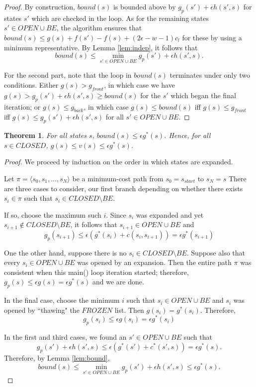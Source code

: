 \documentclass[letterpaper]{article}
\newtheorem{thm}{Theorem}
\begin{document}
\begin{proof}
By construction, $bound(s)$ is bounded above by $g_p(s') + \epsilon h(s',s)$ for states $s'$ which are checked in the loop. As for the remaining states $s' \in OPEN \cup BE$, the algorithm ensures that $bound(s) \le g(s) + f(s') - f(s) + (2\epsilon-w-1) c_l$ for these by using a minimum representative. By Lemma \ref{lem:indep}, it follows that
\[bound(s) \le \min_{s' \in OPEN \cup BE} g_p(s') + \epsilon h(s',s).\]

For the second part, note that the loop in $bound(s)$ terminates under only two conditions. Either $g(s) > g_{front}$, in which case we have $g(s) > g_p(s') + \epsilon h(s',s) \ge bound(s)$ for the $s'$ which began the final iteration; or $g(s) \le g_{back}$, in which case $g(s) \le bound(s)$ iff $g(s) \le g_{front}$ iff $g(s) \le g_p(s') + \epsilon h(s',s)$ for all $s' \in OPEN \cup BE$.
\end{proof}

\begin{thm}
\label{thm:subopt}
For all states $s$, $bound(s) \le \epsilon g^*(s)$. Hence, for all $s\in CLOSED$, $g(s) \le v(s) \le \epsilon g^*(s)$.
\end{thm}

\begin{proof}
We proceed by induction on the order in which states are expanded.

Let $\pi = \langle s_0,s_1,\ldots,s_N \rangle$ be a minimum-cost path from $s_0 = s_{start}$ to $s_N = s$
There are three cases to consider, our first branch depending on whether there exists $s_i\in\pi$ such that $s_i\in CLOSED\setminus BE$.

If so, choose the maximum such $i$. Since $s_i$ was expanded and yet $s_{i+1}\notin CLOSED\setminus BE$,  it follows that $s_{i+1}\in OPEN \cup BE$ and
\[g_p(s_{i+1}) \le \epsilon(g^*(s_i) + c(s_i,s_{i+1})) = \epsilon g^*(s_{i+1})\]

One the other hand, suppose there is no $s_i\in CLOSED\setminus BE$. Suppose also that every $s_i\in OPEN\cup BE$ was opened by an expansion. Then the entire path $\pi$ was consistent when this main() loop iteration started; therefore, $g_p(s) \le \epsilon g(s) = \epsilon g^*(s)$ and we are done.

In the final case, choose the minimum $i$ such that $s_i\in OPEN\cup BE$ and $s_i$ was opened by ``thawing" the $FROZEN$ list. Then $g(s_i) = g^*(s_i)$. Therefore,
\[g_p(s_i) \le \epsilon g(s_i) = \epsilon g^*(s_i)\]

In the first and third cases, we found an $s'\in OPEN\cup BE$ such that
\[g_p(s') + \epsilon h(s',s) \le \epsilon\left(g^*(s') + c^*(s',s)\right) = \epsilon g^*(s).\]
Therefore, by Lemma \ref{lem:bound},
\[bound(s) \le \min_{s' \in OPEN \cup BE} g_p(s') + \epsilon h(s',s) \le \epsilon g^*(s).\]
\end{proof}
\end{document}
